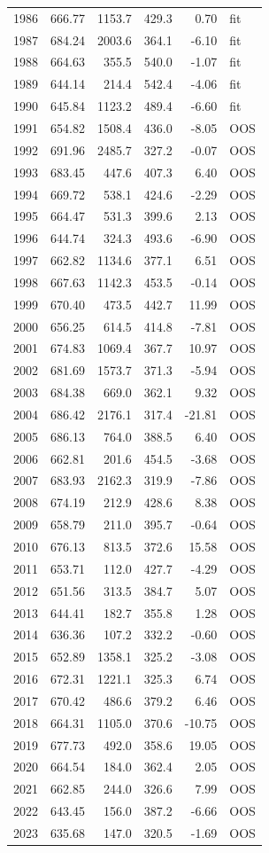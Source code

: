\begin{longtable}{rrrrrl}
1986 & 666.77 & 1153.7 & 429.3 & 0.70 & fit \\
1987 & 684.24 & 2003.6 & 364.1 & -6.10 & fit \\
1988 & 664.63 & 355.5 & 540.0 & -1.07 & fit \\
1989 & 644.14 & 214.4 & 542.4 & -4.06 & fit \\
1990 & 645.84 & 1123.2 & 489.4 & -6.60 & fit \\
1991 & 654.82 & 1508.4 & 436.0 & -8.05 & OOS \\
1992 & 691.96 & 2485.7 & 327.2 & -0.07 & OOS \\
1993 & 683.45 & 447.6 & 407.3 & 6.40 & OOS \\
1994 & 669.72 & 538.1 & 424.6 & -2.29 & OOS \\
1995 & 664.47 & 531.3 & 399.6 & 2.13 & OOS \\
1996 & 644.74 & 324.3 & 493.6 & -6.90 & OOS \\
1997 & 662.82 & 1134.6 & 377.1 & 6.51 & OOS \\
1998 & 667.63 & 1142.3 & 453.5 & -0.14 & OOS \\
1999 & 670.40 & 473.5 & 442.7 & 11.99 & OOS \\
2000 & 656.25 & 614.5 & 414.8 & -7.81 & OOS \\
2001 & 674.83 & 1069.4 & 367.7 & 10.97 & OOS \\
2002 & 681.69 & 1573.7 & 371.3 & -5.94 & OOS \\
2003 & 684.38 & 669.0 & 362.1 & 9.32 & OOS \\
2004 & 686.42 & 2176.1 & 317.4 & -21.81 & OOS \\
2005 & 686.13 & 764.0 & 388.5 & 6.40 & OOS \\
2006 & 662.81 & 201.6 & 454.5 & -3.68 & OOS \\
2007 & 683.93 & 2162.3 & 319.9 & -7.86 & OOS \\
2008 & 674.19 & 212.9 & 428.6 & 8.38 & OOS \\
2009 & 658.79 & 211.0 & 395.7 & -0.64 & OOS \\
2010 & 676.13 & 813.5 & 372.6 & 15.58 & OOS \\
2011 & 653.71 & 112.0 & 427.7 & -4.29 & OOS \\
2012 & 651.56 & 313.5 & 384.7 & 5.07 & OOS \\
2013 & 644.41 & 182.7 & 355.8 & 1.28 & OOS \\
2014 & 636.36 & 107.2 & 332.2 & -0.60 & OOS \\
2015 & 652.89 & 1358.1 & 325.2 & -3.08 & OOS \\
2016 & 672.31 & 1221.1 & 325.3 & 6.74 & OOS \\
2017 & 670.42 & 486.6 & 379.2 & 6.46 & OOS \\
2018 & 664.31 & 1105.0 & 370.6 & -10.75 & OOS \\
2019 & 677.73 & 492.0 & 358.6 & 19.05 & OOS \\
2020 & 664.54 & 184.0 & 362.4 & 2.05 & OOS \\
2021 & 662.85 & 244.0 & 326.6 & 7.99 & OOS \\
2022 & 643.45 & 156.0 & 387.2 & -6.66 & OOS \\
2023 & 635.68 & 147.0 & 320.5 & -1.69 & OOS \\
\end{longtable}
\endgroup

